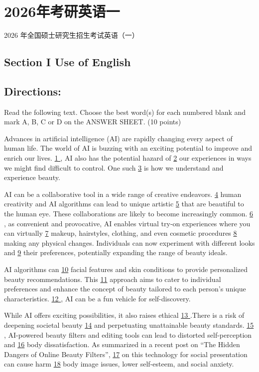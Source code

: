 \documentclass[UTF8,11pt]{ctexart}
\begin{document}
\section*{2026年考研英语一}
2026 年全国硕士研究生招生考试英语（一）


\subsection*{\textbf{Section I Use of English}}


\subsection*{\textbf{Directions:}}


Read the following text. Choose the best word(s) for each numbered blank and mark A, B, C or D on the ANSWER SHEET. (10 points)


Advances in artificial intelligence (AI) are rapidly changing every aspect of human life. The world of AI is buzzing with an exciting potential to improve and enrich our lives. \uline{1 }, AI also has the potential hazard of \uline{2} our experiences in ways we might find difficult to control. One such \uline{3} is how we understand and experience beauty.


AI can be a collaborative tool in a wide range of creative endeavors. \uline{4} human creativity and AI algorithms can lead to unique artistic \uline{5} that are beautiful to the human eye. These collaborations are likely to become increasingly common. \uline{6 }, as convenient and provocative, AI enables virtual try-on experiences where you can virtually \uline{7} makeup, hairstyles, clothing, and even cosmetic procedures \uline{8} making any physical changes. Individuals can now experiment with different looks and \uline{9} their preferences, potentially expanding the range of beauty ideals.


AI algorithms can \uline{10} facial features and skin conditions to provide personalized beauty recommendations. This \uline{11} approach aims to cater to individual preferences and enhance the concept of beauty tailored to each person’s unique characteristics. \uline{12 }, AI can be a fun vehicle for self-discovery.


While AI offers exciting possibilities, it also raises ethical \uline{13 }.There is a risk of deepening societal beauty \uline{14} and perpetuating unattainable beauty standards. \uline{15 }, AI-powered beauty filters and editing tools can lead to distorted self-perception and \uline{16} body dissatisfaction. As summarized in a recent post on “The Hidden Dangers of Online Beauty Filters”, \uline{17} on this technology for social presentation can cause harm \uline{18} body image issues, lower self-esteem, and social anxiety.
\end{document}
